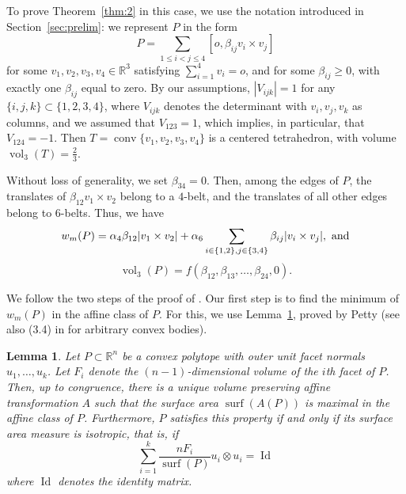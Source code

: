 \documentclass[twoside]{amsart}
\newtheorem{lem}{Lemma}
\theoremstyle{definition}
\renewcommand{\Re}{\mathbb R}
\DeclareMathOperator{\Id}{Id}
\DeclareMathOperator{\conv}{conv}
\DeclareMathOperator{\surf}{surf}
\DeclareMathOperator{\vol}{vol}
\begin{document}
To prove Theorem~\ref{thm:2} in this case, we use the notation introduced in Section~\ref{sec:prelim}: we represent $P$ in the form
\[
P= \sum_{1 \leq i < j \leq 4} [o,\beta_{ij} v_i \times v_j]
\]
for some  $v_1, v_2, v_3, v_4 \in \Re^3$ satisfying $\sum_{i=1}^4 v_i = o$, and for some $\beta_{ij} \geq 0$, with exactly one $\beta_{ij}$ equal to zero. By our assumptions, $|V_{ijk}| = 1$ for any $\{i,j,k \} \subset \{ 1,2,3,4\}$, where $V_{ijk}$ denotes the determinant with $v_i,v_j,v_k$ as columns, and we assumed that $V_{123}=1$, which implies, in particular, that $V_{124}=-1$.
Then $T=\conv \{ v_1, v_2, v_3, v_4 \}$ is a centered tetrahedron, with volume $\vol_3(T)=\frac{2}{3}$.

Without loss of generality, we set $\beta_{34} = 0$. Then, among the edges of $P$, the translates of $\beta_{12} v_1 \times v_2$ belong to a $4$-belt, and the translates of all other edges belong to $6$-belts. Thus, we have
\[
w_m(P) = \alpha_4 \beta_{12} | v_1 \times v_2| + \alpha_6 \sum_{i \in \{1,2 \}, j \in \{ 3,4 \} }\beta_{ij} |v_i \times v_j|, \hbox{ and}
\]
\[
\vol_3(P) = f(\beta_{12}, \beta_{13},\ldots, \beta_{24}, 0).
\]

We follow the two steps of the proof of \cite[Theorem 1]{Langi}. Our first step is to find the minimum of $w_m(P)$ in the affine class of $P$. For this, we use Lemma~\ref{lem:isotropic}, proved by Petty \cite{Petty} (see also (3.4) in \cite{Giannopoulos} for arbitrary convex bodies).

\begin{lem}\label{lem:isotropic}
Let $P \subset \Re^n$ be a convex polytope with outer unit facet normals $u_1, \ldots, u_k$. Let $F_i$ denote the $(n-1)$-dimensional volume of the $i$th facet of $P$. Then, up to congruence, there is a unique volume preserving affine transformation $A$ such that the surface area $\surf(A(P))$ is maximal in the affine class of $P$. Furthermore, $P$ satisfies this property if and only if its surface area measure is isotropic, that is, if
\begin{equation}\label{eq:isotropic}
\sum_{i=1}^k \frac{n F_i}{\surf(P)} u_i \otimes u_i = \Id
\end{equation}
where $\Id$ denotes the identity matrix.
\end{lem}
\end{document}
